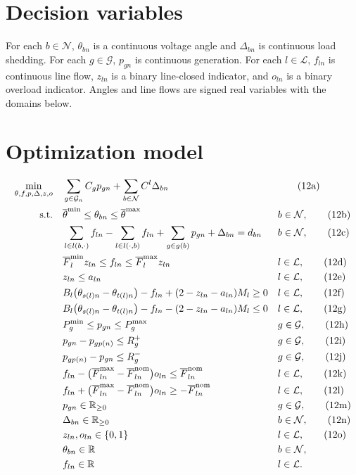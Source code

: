 \documentclass{article}
\begin{document}
\section*{Decision variables}
For each $b\in\mathcal N$, $\theta_{bn}$ is a continuous voltage angle and $\Delta_{bn}$ is continuous load shedding. For each $g\in\mathcal G$, $p_{gn}$ is continuous generation. For each $l\in\mathcal L$, $f_{ln}$ is continuous line flow, $z_{ln}$ is a binary line-closed indicator, and $o_{ln}$ is a binary overload indicator. Angles and line flows are signed real variables with the domains below.

\section*{Optimization model}
\begin{align}
\min_{\theta,f,p,\Delta,z,o}\quad
 &\sum_{g\in\mathcal G_n}C_g p_{gn}
   +\sum_{b\in\mathcal N}C^l\Delta_{bn}
 &&\tag{12a}\\
\text{s.t.}\quad
 &\overline\theta^{\min}\leq\theta_{bn}\leq\overline\theta^{\max}
 && b\in\mathcal N,\tag{12b}\\
 &\sum_{l\in l(b,\cdot)}f_{ln}
  -\sum_{l\in l(\cdot,b)}f_{ln}
  +\sum_{g\in g(b)}p_{gn}+\Delta_{bn}=d_{bn}
 && b\in\mathcal N,\tag{12c}\\
 &\overline F_l^{\min}z_{ln}\leq f_{ln}\leq\overline F_l^{\max}z_{ln}
 && l\in\mathcal L,\tag{12d}\\
 &z_{ln}\leq a_{ln}
 && l\in\mathcal L,\tag{12e}\\
 &B_l\bigl(\theta_{s(l)n}-\theta_{t(l)n}\bigr)-f_{ln}
   +(2-z_{ln}-a_{ln})M_l\geq0
 && l\in\mathcal L,\tag{12f}\\
 &B_l\bigl(\theta_{s(l)n}-\theta_{t(l)n}\bigr)-f_{ln}
   -(2-z_{ln}-a_{ln})M_l\leq0
 && l\in\mathcal L,\tag{12g}\\
 &P_g^{\min}\leq p_{gn}\leq P_g^{\max}
 && g\in\mathcal G,\tag{12h}\\
 &p_{gn}-p_{g p(n)}\leq R_g^+
 && g\in\mathcal G,\tag{12i}\\
 &p_{g p(n)}-p_{gn}\leq R_g^-
 && g\in\mathcal G,\tag{12j}\\
 &f_{ln}-\bigl(\overline F_{ln}^{\max}-\overline F_{ln}^{\mathrm{nom}}\bigr)o_{ln}
   \leq\overline F_{ln}^{\mathrm{nom}}
 && l\in\mathcal L,\tag{12k}\\
 &f_{ln}+\bigl(\overline F_{ln}^{\max}-\overline F_{ln}^{\mathrm{nom}}\bigr)o_{ln}
   \geq-\overline F_{ln}^{\mathrm{nom}}
 && l\in\mathcal L,\tag{12l}\\
 &p_{gn}\in\mathbb R_{\geq0}
 && g\in\mathcal G,\tag{12m}\\
 &\Delta_{bn}\in\mathbb R_{\geq0}
 && b\in\mathcal N,\tag{12n}\\
 &z_{ln},o_{ln}\in\{0,1\}
 && l\in\mathcal L,\tag{12o}\\
 &\theta_{bn}\in\mathbb R
 && b\in\mathcal N,\notag\\
 &f_{ln}\in\mathbb R
 && l\in\mathcal L.\notag
\end{align}
\end{document}
